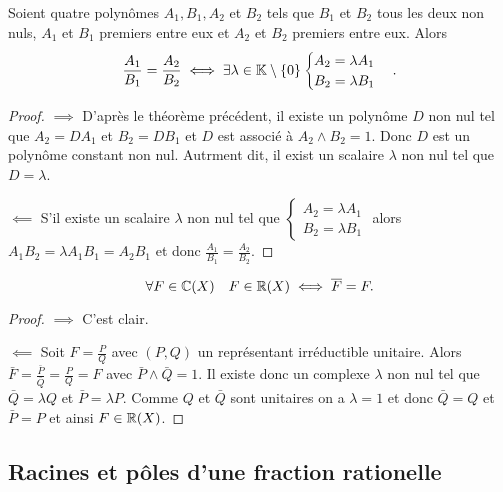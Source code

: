 \begin{theo}\label{theo:thm3}
  Soient quatre polynômes \(A_1,B_1,A_2\) et \(B_2\) tels que \(B_1\) et \(B_2\) tous les deux non nuls, \(A_1\) et \(B_1\) premiers entre eux et \(A_2\) et \(B_2\) premiers entre eux. Alors
  \begin{equation}
    \frac{A_1}{B_1}=\frac{A_2}{B_2} \iff \exists \lambda \in \mathbb{K}\setminus\{0\} \begin{cases} A_2=\lambda A_1 \\ B_2 = \lambda B_1 \end{cases}.
  \end{equation}
\end{theo}
\begin{proof}
  \(\implies\) D'après le théorème précédent, il existe un polynôme \(D\) non nul tel que \(A_2=D A_1\) et \(B_2=DB_1\) et \(D\) est associé à  \(A_2 \wedge B_2=1\). Donc \(D\) est un polynôme constant non nul. Autrment dit, il exist un scalaire \(\lambda\) non nul tel que \(D=\lambda\).

  \(\impliedby\) S'il existe un scalaire \(\lambda\) non nul tel que \(\begin{cases} A_2=\lambda A_1 \\ B_2 = \lambda B_1 \end{cases}\) alors \(A_1B_2=\lambda A_1B_1=A_2B_1\) et donc \(\frac{A_1}{B_1}=\frac{A_2}{B_2}\).
\end{proof}

\begin{prop}
  \begin{equation}
    \forall F \in \mathbb{C}(X) \quad F \in \mathbb{R}(X) \iff \overline{F}=F.
  \end{equation}
\end{prop}
\begin{proof}
  \(\implies\) C'est clair.

  \(\impliedby\) Soit \(F=\frac{P}{Q}\) avec \((P,Q)\) un représentant irréductible unitaire. Alors \(\bar{F}=\frac{\bar{P}}{\bar{Q}}=\frac{P}{Q}=F\) avec \(\bar{P}\wedge \bar{Q} =1\). Il existe donc un complexe \(\lambda\) non nul tel que \(\bar{Q}=\lambda Q\) et \(\bar{P}=\lambda P\). Comme \(Q\) et \(\bar{Q}\) sont unitaires on a \(\lambda=1\) et donc \(\bar{Q}=Q\) et \(\bar{P}=P\) et ainsi \(F \in \mathbb{R}(X)\).
\end{proof}

\subsection{Racines et pôles d'une fraction rationelle}

